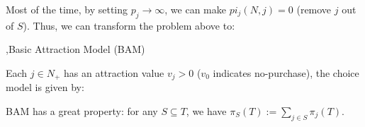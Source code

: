 \documentclass[10pt]{report}
\begin{document}
Most of the time, by setting $p_j \to \infty$, we can make $pi_j(N,j)=0$ (remove $j$ out of $S$). Thus, we can transform the problem above to:


\sep{Basic Attraction Model (BAM)}

Each $j\in N_+$ has an attraction value $v_j>0$ ($v_0$ indicates no-purchase), the choice model is given by:


BAM has a great property: for any $S\subseteq T$, we have $\pi_S(T):=\sum_{j\in S}\pi_j(T)$.

\end{document}

